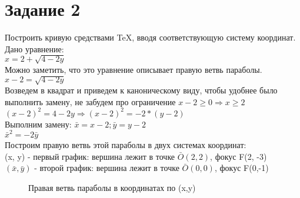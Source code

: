 \documentclass[12pt, a4paper]{article}
\begin{document}
\section*{Задание 2}
Построить кривую средствами \TeX, вводя соответствующую систему координат.\\
Дано уравнение:\\
$x=2+\sqrt{4-2y}$\\
Можно заметить, что это уравнение описывает правую 
ветвь параболы.\\
$x-2=\sqrt{4-2y}$\\
Возведем в квадрат и приведем к каноническому виду,
чтобы удобнее было выполнить замену, не забудем про 
ограничение $x-2 \geq 0 \Rightarrow x \geq 2$\\
$(x-2)^2=4-2y \Rightarrow (x-2)^2=-2*(y-2)$\\
Выполним замену: $\bar x = x-2; \bar y = y-2$\\
$\bar x^2=-2\bar y$\\
Построим правую ветвь этой параболы в двух 
системах координат:\\
(x, y) - первый график: вершина лежит в точке $\bar 
O(2,2)$, фокус F(2, -3)\\
$(\bar x, \bar y)$ - второй график: вершина лежит в
точке $\bar O(0, 0)$, фокус F(0,-1)
\begin{figure}
\begin{center}
\end{center}
\caption{Правая ветвь параболы в координатах по (x,y)}
\end{figure}
\end{document}
